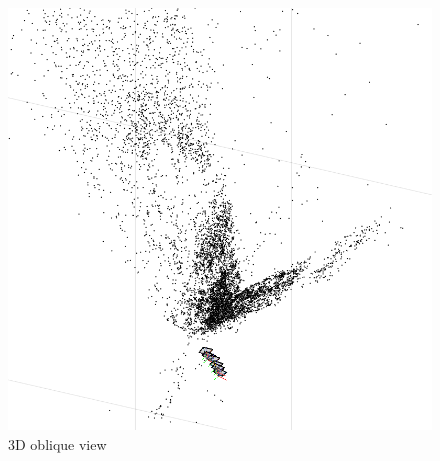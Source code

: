 \documentclass[10pt,letterpaper]{article}
\begin{document}
\begin{enumerate}[]
\begin{figure}[h!]
  \includegraphics[width=5in]{../images/final-3d-oblique}
  \caption
   {3D oblique view}
\end{figure} \\

\newpage




\end{enumerate}
\end{document}
